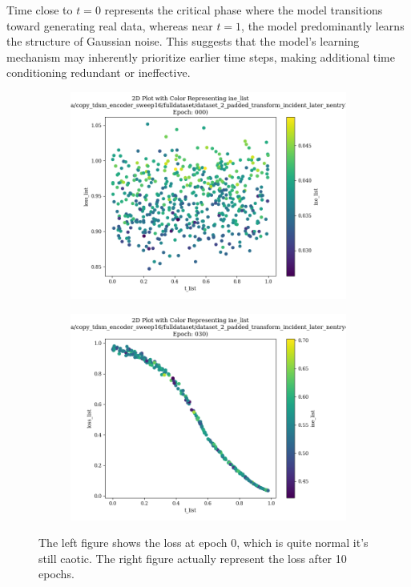 Time close to $t = 0$ represents the critical phase where the model transitions toward generating real data, whereas near $t = 1$, the model predominantly learns the structure of Gaussian noise. This suggests that the model's learning mechanism may inherently prioritize earlier time steps, making additional time conditioning redundant or ineffective.

\begin{figure}[htbp]
    \centering
    \begin{subfigure}[b]{0.45\textwidth} %
        \includegraphics[width=\textwidth]{Figures/loss_t_0.png}
        \caption{}
        \label{fig:loss_t_0}
    \end{subfigure}
    \hfill %
    \begin{subfigure}[b]{0.45\textwidth}
        \includegraphics[width=\textwidth]{Figures/loss_t_10.png}
        \caption{}
        \label{fig:loss_t_10}
    \end{subfigure}
    
    \caption{The left figure shows the loss at epoch 0, which is quite normal it's still caotic. The right figure actually represent the loss after 10 epochs.}
    \label{fig:loss_t}
\end{figure}

